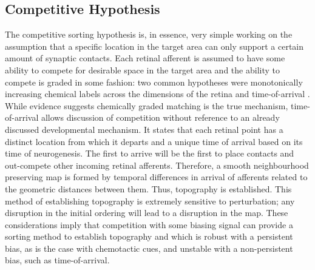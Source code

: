 \subsection{Competitive Hypothesis}
The competitive sorting hypothesis is, in essence, very simple working on the assumption that a specific location in the target area can only support a certain amount of synaptic contacts. Each retinal afferent is assumed to have some ability to compete for desirable space in the target area and the ability to compete is graded in some fashion: two common hypotheses were monotonically increasing chemical labels across the dimensions of the retina and time-of-arrival \cite{Prestige1975-vh, jacobson1960studies, Gaze1960-hw}. While evidence suggests chemically graded matching is the true mechanism, time-of-arrival allows discussion of competition without reference to an already discussed developmental mechanism. It states that each retinal point has a distinct location from which it departs and a unique time of arrival based on its time of neurogenesis. The first to arrive will be the first to place contacts and out-compete other incoming retinal afferents. Therefore, a smooth neighbourhood preserving map is formed by temporal differences in arrival of afferents related to the geometric distances between them. Thus, topography is established. This method of establishing topography is extremely sensitive to perturbation; any disruption in the initial ordering will lead to a disruption in the map. These considerations imply that competition with some biasing signal can provide a sorting method to establish topography and which is robust with a persistent bias, as is the case with chemotactic cues, and unstable with a non-persistent bias, such as time-of-arrival.
